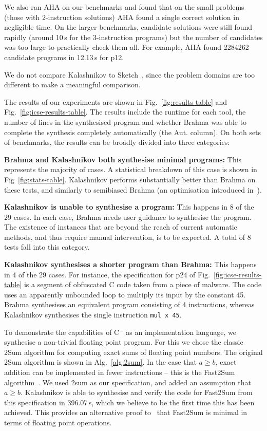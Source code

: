 \documentclass[a4paper]{llncs}
\newcommand{\newC}{C$^-$\xspace}
\begin{document}
We also ran {\sc AHA} on our benchmarks and found that on the small problems (those with 2-instruction solutions)
{\sc AHA} found a single correct solution in negligible time.  On the larger benchmarks, candidate solutions
were still found rapidly (around 10\,s for the 3-instruction programs) but the number of candidates was
too large to practically check them all.  For example, {\sc AHA} found 2284262 candidate
programs in 12.13\,s for p12.

We do not compare {\sc Kalashnikov} to {\sc Sketch}~\cite{sketch}, since the problem domains are
too different to make a meaningful comparison.

The results of our experiments are shown in Fig.~\ref{fig:results-table} and Fig.~\ref{fig:icse-results-table}.
The results include the runtime for each tool, the number of lines in the synthesised program and whether
{\sc Brahma} was able to complete the synthesis completely automatically (the Aut. column).
On both sets of benchmarks, the results can be broadly divided into three categories:

{\bf {\sc Brahma} and {\sc Kalashnikov} both synthesise minimal programs:}
This represents the majority of cases.  A statistical breakdown of this case is shown in Fig~\ref{fig:stats-table}.
{\sc Kalashnikov} performs substantially better than {\sc Brahma} on these tests, and similarly to
semibiased {\sc Brahma} (an optimisation introduced in~\cite{brahma-icse}).

{\bf {\sc Kalashnikov} is unable to synthesise a program:}
This happens in 8 of the 29 cases.  In each case, {\sc Brahma} needs user guidance to synthesise the program.
The existence of instances that are beyond the reach of current automatic
methods, and thus require manual intervention, is to be expected. A total of 8 tests fall into this category.

{\bf {\sc Kalashnikov} synthesises a shorter program than {\sc Brahma}:}
This happens in 4 of the 29 cases.  For instance, the specification for p24 of Fig.~\ref{fig:icse-results-table} 
is a segment of obfuscated C code taken from a piece of malware.  The code uses an apparently unbounded loop
to multiply its input by the constant 45.  {\sc Brahma} synthesises an equivalent program consisting of
4 instructions, whereas {\sc Kalashnikov} synthesises the single instruction \texttt{mul x 45}.

To demonstrate the capabilities of \newC as an implementation language, we synthesise a
non-trivial floating point program.  For this we chose the classic {\sc 2Sum} algorithm for computing
exact sums of floating point numbers.  The original {\sc 2Sum} algorithm is shown in Alg.~\ref{alg:2sum}.
In the case that $a \ge b$, exact addition can be implemented in fewer instructions -- this is the
{\sc Fast2Sum} algorithm~\cite{fast2sum}.  We used {\sc 2sum} as our specification, and
added an assumption that $a \ge b$.  {\sc Kalashnikov} is able to synthesise and verify the
code for {\sc Fast2Sum} from this specification in 396.07\,s, which we believe to be the first time
this has been achieved.  This provides an alternative proof to~\cite{fast2sum} that {\sc Fast2Sum} is
minimal in terms of floating point operations.
\end{document}

